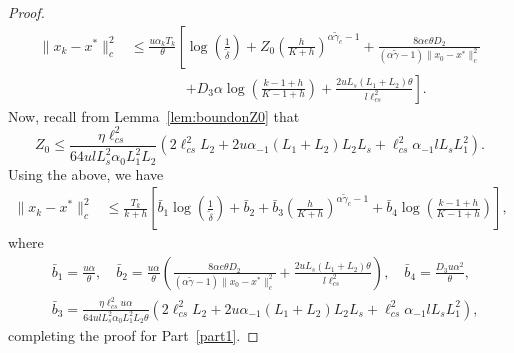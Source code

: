 \documentclass{article}
\newcommand{\lrp}[1]{\left( #1 \right)}
\newcommand{\lcs}{\ell_{cs}}
\begin{document}
\begin{proof}
\begin{align*}
    \|x_k - x^*\|^2_c & \le \frac{u\alpha_k T_k}{\theta} \left[ \log\left(\frac{1}{\tilde{\delta}}\right) + Z_0\lrp{\frac{h}{K+h}}^{\alpha\tilde{\gamma}_c - 1} + \frac{8\alpha e \theta D_2}{(\alpha \tilde{\gamma} - 1)\|x_0 - x^*\|^2_c}  \right. \\
    &\qquad\qquad \left. + {D_3 \alpha } \log\left(\frac{k-1+h}{K-1+h}\right) + \frac{ 2u L_s (L_1 + L_2) \theta }{ l\lcs^2} \right] . 
\end{align*}
Now, recall from Lemma~\ref{lem:boundonZ0} that 
\[ Z_0 \le \frac{\eta\lcs^2}{64 ul L^2_s \alpha_0 L^2_1 L_2 }\lrp{2\lcs^2 L_2 +  2 u \alpha_{-1} (L_1 + L_2)  L_2 L_s + \lcs^2 \alpha_{-1} l L_s L^2_1 }. \]
Using the above, we have
\begin{align*}
    \|x_k - x^*\|^2_c & \le \frac{T_k}{k+h} \left[ \bar{b}_1\log\left(\frac{1}{\tilde{\delta}}\right) + \bar{b}_2 + \bar{b}_3\lrp{\frac{h}{K+h}}^{\alpha\tilde{\gamma}_c - 1}    + \bar{b}_4  \log\left(\frac{k-1+h}{K-1+h}\right)  \right], 
\end{align*}
where
\begin{align*}
    &\bar{b}_1 = \frac{u\alpha}{\theta}, \quad \bar{b}_2 = \frac{u\alpha}{\theta}\lrp{ \frac{8\alpha e \theta D_2}{(\alpha \tilde{\gamma} - 1)\|x_0 - x^*\|^2_c} + \frac{ 2u L_s (L_1 + L_2) \theta }{ l\lcs^2}},\quad \bar{b}_4 = \frac{D_3 u\alpha^2}{\theta},\\
    & \bar{b}_3 = \frac{\eta\lcs^2 u\alpha}{64 ul L^2_s \alpha_0 L^2_1 L_2 \theta }\lrp{2\lcs^2 L_2 +  2 u \alpha_{-1} (L_1 + L_2)  L_2 L_s + \lcs^2 \alpha_{-1} l L_s L^2_1 },
\end{align*}
completing the proof for Part~\ref{part1}. 
\end{proof}
\end{document}

